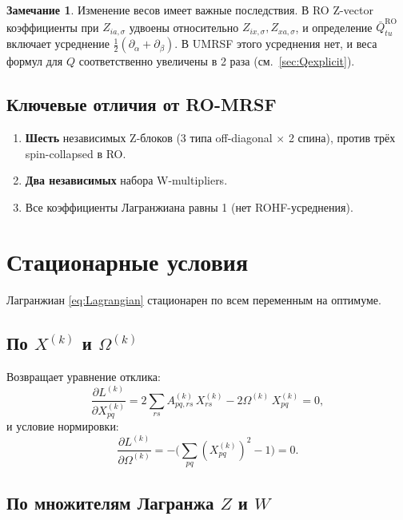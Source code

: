 \documentclass[11pt, a4paper]{article}
\theoremstyle{definition}
\newtheorem{remark}{Замечание}[section]
\newcommand{\bQ}{\bar Q}
\newcommand{\Xk}[2]{X^{(#1)}_{#2}}
\begin{document}
\begin{remark}
Изменение весов имеет важные последствия. В RO Z-vector коэффициенты при $Z_{ia,\sigma}$ удвоены относительно $Z_{ix,\sigma}, Z_{xa,\sigma}$, и определение $\bQ^{\text{RO}}_{tu}$ включает усреднение $\tfrac{1}{2}(\partial_\alpha + \partial_\beta)$. В UMRSF этого усреднения нет, и веса формул для $Q$ соответственно увеличены в 2 раза (см.\ \cref{sec:Qexplicit}).
\end{remark}

\subsection{Ключевые отличия от RO-MRSF}

\begin{enumerate}
    \item \textbf{Шесть} независимых Z-блоков (3 типа off-diagonal $\times$ 2 спина), против трёх spin-collapsed в RO.
    \item \textbf{Два независимых} набора W-multipliers.
    \item Все коэффициенты Лагранжиана равны 1 (нет ROHF-усреднения).
\end{enumerate}

\section{Стационарные условия}
\label{sec:stationary}

Лагранжиан \eqref{eq:Lagrangian} стационарен по всем переменным на оптимуме.

\subsection{По $X^{(k)}$ и $\Omega^{(k)}$}

Возвращает уравнение отклика:
\begin{equation}
    \frac{\partial L^{(k)}}{\partial \Xk{k}{pq}} = 2 \sum_{rs} A^{(k)}_{pq, rs}\, \Xk{k}{rs} - 2 \Omega^{(k)}\, \Xk{k}{pq} = 0,
\end{equation}
и условие нормировки:
\begin{equation}
    \frac{\partial L^{(k)}}{\partial \Omega^{(k)}} = -\biggl( \sum_{pq} (\Xk{k}{pq})^2 - 1 \biggr) = 0.
\end{equation}

\subsection{По множителям Лагранжа $Z$ и $W$}
\end{document}
